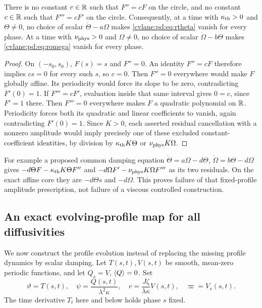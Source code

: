 \begin{cvlanepdproposition}\label{cvlane:pd:prop:noeig}
There is no constant $c\in\mathbb R$ such that $F''=cF$ on the circle, and no
constant $c\in\mathbb R$ such that $F'''=cF'$ on the circle. Consequently, at
a time with $\kappa_{\rm th}>0$ and $\Theta\ne0$, no choice of scalar
$\dot\Theta-a\Omega$ makes \eqref{cvlane:pd:eq:rtheta} vanish for every phase.
At a time with $\nu_{\rm phys}>0$ and $\Omega\ne0$, no choice of scalar
$\dot\Omega-b\Theta$ makes \eqref{cvlane:pd:eq:romega} vanish for every phase.
\end{cvlanepdproposition}
\begin{proof}
On $(-s_0,s_0)$, $F(s)=s$ and $F''=0$. An identity $F''=cF$ therefore
implies $cs=0$ for every such $s$, so $c=0$. Then $F''=0$ everywhere
would make $F$ globally affine. Its periodicity would force its slope to be
zero, contradicting $F'(0)=1$.
If $F'''=cF'$, evaluation inside that same interval gives $0=c$, since
$F'=1$ there. Then $F'''=0$ everywhere makes $F$ a quadratic polynomial
on $\mathbb R$. Periodicity forces both its quadratic and linear coefficients
to vanish, again contradicting $F'(0)=1$.
Since $K>0$, each asserted residual cancellation with a nonzero amplitude
would imply precisely one of these excluded constant-coefficient
identities, by division by $\kappa_{\rm th} K\Theta$ or $\nu_{\rm phys} K\Omega$.
\end{proof}

For example a proposed common damping equation
$\dot\Theta=a\Omega-d\Theta$, $\dot\Omega=b\Theta-d\Omega$ gives
$-d\Theta F-\kappa_{\rm th} K\Theta F''$ and
$-d\Omega F'-\nu_{\rm phys} K\Omega F'''$ as its two residuals. On the exact affine
core they are $-d\Theta s$ and $-d\Omega$.
This proves failure of that fixed-profile amplitude prescription, not
failure of a viscous controlled construction.

\subsection{An exact evolving-profile map for all diffusivities}

We now construct the profile evolution instead of replacing the missing
profile dynamics by scalar damping. Let $T(s,t),V(s,t)$ be smooth,
mean-zero periodic functions, and let $Q_s=V$, $\langle Q\rangle=0$. Set
\begin{equation}\label{cvlane:pd:eq:generalprofile}
 \vartheta=T(s,t),\quad \psi=\frac{Q(s,t)}{\lambda^2\kappa},\quad
 v=\frac{J\zeta}{\lambda\kappa}V(s,t),\quad \varpi=V_s(s,t).
\end{equation}
The time derivative $T_t$ here and below holds phase $s$ fixed.

